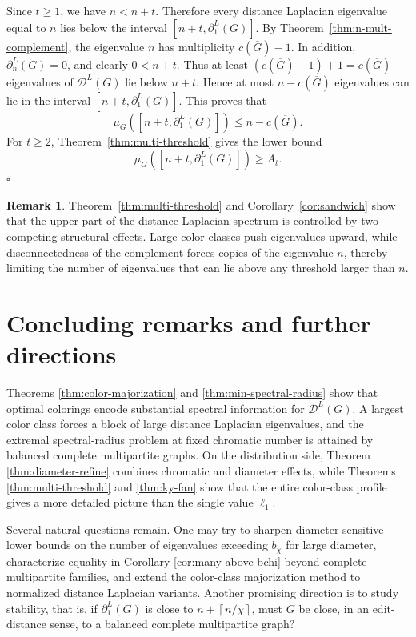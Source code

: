 \documentclass[12pt]{article}
\newcommand{\DL}{\mathcal{D}^{L}}
\newcommand{\comp}[1]{\overline{#1}}
\newcommand{\ceil}[1]{\left\lceil #1 \right\rceil}
\theoremstyle{plain}
\theoremstyle{definition}
\newtheorem{remark}[theorem]{Remark}
\renewenvironment{proof}{{\noindent\bfseries Proof. }}{\hfill$\square$\par}
\begin{document}
\begin{proof}
	Since $t\ge1$, we have  $n<n+t.$ Therefore every distance Laplacian eigenvalue equal to $n$ lies below the interval
	$[n+t,\partial^{L}_1(G)]$. By Theorem~\ref{thm:n-mult-complement}, the eigenvalue $n$ has multiplicity
	 $c(\comp{G})-1.$ In addition, $\partial_n^{L}(G)=0$, and clearly
	 $0<n+t.$ 	Thus at least $(c(\comp{G})-1)+1=c(\comp{G})$ eigenvalues of $\DL(G)$ lie below $n+t$. Hence at most
	 $n-c(\comp{G})$ eigenvalues can lie in the interval $[n+t,\partial^{L}_1(G)]$. This proves that 
	\[
	\mu_G([n+t,\partial^{L}_1(G)])\le n-c(\comp{G}).
	\]
	 For $t\ge2$, Theorem~\ref{thm:multi-threshold} gives the lower bound
	\[
	\mu_G([n+t,\partial^{L}_1(G)])\ge A_t.
	\]
\end{proof}

\begin{remark}
	Theorem~\ref{thm:multi-threshold} and Corollary~\ref{cor:sandwich} show that the upper part of the distance Laplacian spectrum is controlled by two competing structural effects. Large color classes push eigenvalues upward, while disconnectedness of the complement forces copies of the eigenvalue $n$, thereby limiting the number of eigenvalues that can lie above any threshold larger than $n$.
\end{remark}

\section{Concluding remarks and further directions}\label{conclusion}

Theorems \ref{thm:color-majorization} and \ref{thm:min-spectral-radius} show that optimal colorings encode substantial spectral
information for $\DL(G)$. A largest color class forces a block of large distance Laplacian eigenvalues, and the extremal
spectral-radius problem at fixed chromatic number is attained by balanced complete multipartite graphs. On the distribution
side, Theorem \ref{thm:diameter-refine} combines chromatic and diameter effects, while Theorems \ref{thm:multi-threshold} and
\ref{thm:ky-fan} show that the entire color-class profile gives a more detailed picture than the single value $\ell_1$.

\noindent  Several natural questions remain. One may try to sharpen diameter-sensitive lower bounds on the number of eigenvalues exceeding
$b_\chi$ for large diameter, characterize equality in Corollary \ref{cor:many-above-bchi} beyond complete multipartite families,
and extend the color-class majorization method to normalized distance Laplacian variants. Another promising direction is to
study stability, that is, if $\partial_1^L(G)$ is close to $n+\ceil{n/\chi}$, must $G$ be close, in an edit-distance sense, to a balanced
complete multipartite graph?
\end{document}
